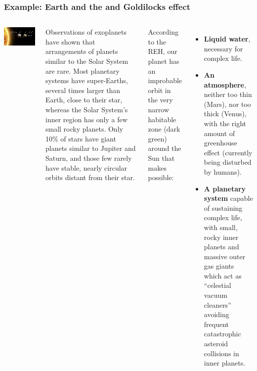 \begin{frame}
\frametitle{Example: Earth and the and Goldilocks effect}

\begin{columns}

\includegraphics[scale=0.35]{solarsystem}

Observations of exoplanets have shown that arrangements of planets similar to the Solar System are rare. Most planetary systems have super-Earths, several times larger than Earth, close to their star, whereas the Solar System's inner region has only a few small rocky planets. Only 10\% of stars have giant planets similar to Jupiter and Saturn, and those few rarely have stable, nearly circular orbits distant from their star.

According to the REH, our planet has an improbable orbit in the very narrow habitable zone (dark green) around the Sun that makes possible:
\begin{itemize}
\item {\bf Liquid water}, necessary for complex life.
\item {\bf An atmosphere}, neither too thin (Mars), nor too thick (Venus), with the right amount of greenhouse effect (currently being disturbed by humans).
\item {\bf A planetary system} capable of sustaining complex life, with small, rocky inner planets and massive outer gas giants which act as ``celestial vacuum cleaners'' avoiding frequent catastrophic asteroid collisions in inner planets.
\end{itemize}


\end{columns}
\end{frame}


